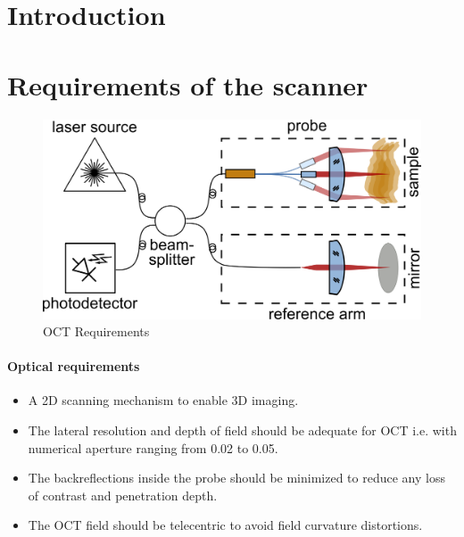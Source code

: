 \documentclass[10pt]{iopart}
\begin{document}
\section{Introduction}

\section{Requirements of the scanner}
\begin{figure}[h!]\centering \includegraphics[width=\columnwidth]{figures/OCTsystem.png}
      \caption{OCT Requirements}
\end{figure}

\paragraph{Optical requirements}

\begin{itemize}
\item A 2D scanning mechanism to enable 3D imaging.
\item The lateral resolution and depth of field should be adequate for OCT i.e. with numerical aperture ranging from 0.02 to 0.05.
\item The backreflections inside the probe should be minimized to reduce any loss of contrast and penetration depth.
\item The OCT field should be telecentric to avoid field curvature distortions.
\end{itemize}
\end{document}
